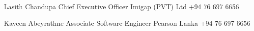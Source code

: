 

\begin{cventries}

  \cventry
    {Lasith Chandupa } %
    {Chief Executive Officer} %
    {Imigap (PVT) Ltd} %
    {+94 76 697 6656} %
    {
      \begin{cvitems} %
      \end{cvitems}
    }



  \cventry
    {Kaveen Abeyrathne} %
    {Associate Software Engineer} %
    {Pearson Lanka} %
    {+94 76 697 6656} %
    {
      \begin{cvitems} %
      \end{cvitems}
    }



\end{cventries}
